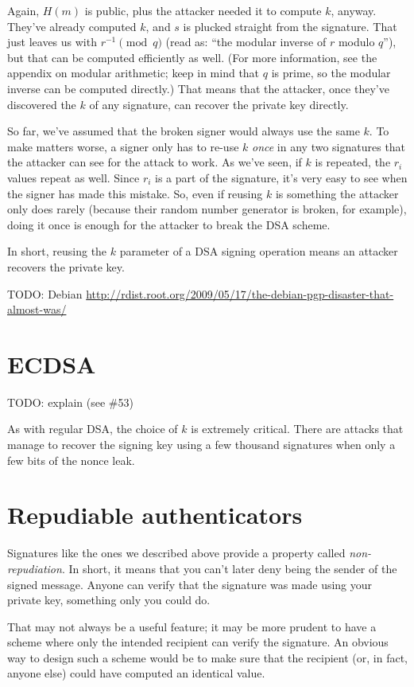 \documentclass[11pt,ebook,table,dvipsnames]{memoir}
\begin{document}
Again, $H(m)$ is public, plus the attacker needed it to compute $k$,
anyway. They've already computed $k$, and $s$ is plucked straight from
the signature. That just leaves us with $r^{-1} \pmod q$ (read as:
\enquote{the modular inverse of $r$ modulo $q$}), but that can be computed
efficiently as well. (For more information, see the appendix on
modular arithmetic; keep in mind that $q$ is prime, so the modular
inverse can be computed directly.) That means that the attacker, once
they've discovered the $k$ of any signature, can recover the private
key directly.

So far, we've assumed that the broken signer would always use the same
$k$. To make matters worse, a signer only has to re-use $k$ \emph{once} in
any two signatures that the attacker can see for the attack to work.
As we've seen, if $k$ is repeated, the $r_i$ values repeat as well.
Since $r_i$ is a part of the signature, it's very easy to see when the
signer has made this mistake. So, even if reusing $k$ is something the
attacker only does rarely (because their random number generator is
broken, for example), doing it once is enough for the attacker to
break the DSA scheme.

In short, reusing the $k$ parameter of a DSA signing operation means
an attacker recovers the private key.

TODO: Debian \url{http://rdist.root.org/2009/05/17/the-debian-pgp-disaster-that-almost-was/}
\section{ECDSA}
\label{sec-2-8-4}

TODO: explain (see \#53)

As with regular DSA, the choice of $k$ is extremely critical. There
are attacks that manage to recover the signing key using a few
thousand signatures when only a few bits of the nonce leak.
\cite{demulder:ecdsa}
\section{Repudiable authenticators}
\label{sec-2-8-5}

Signatures like the ones we described above provide a property called
\emph{non-repudiation}. In short, it means that you can't later deny being
the sender of the signed message. Anyone can verify that the signature
was made using your private key, something only you could do.

That may not always be a useful feature; it may be more prudent to
have a scheme where only the intended recipient can verify the
signature. An obvious way to design such a scheme would be to make
sure that the recipient (or, in fact, anyone else) could have
computed an identical value.
\end{document}
